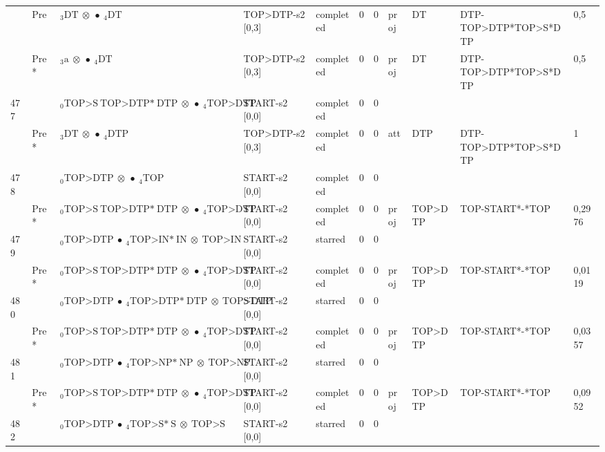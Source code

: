 \documentclass[10pt]{article}
\begin{document}
\begin{longtable}[htbp]{lllllllllll}
 & Pre & $ {}_3 \textrm{DT} \  \otimes \  \bullet \ {}_{4} \textrm{DT} $ & TOP>DTP-s2 [0,3] & completed & 0 & 0 & proj & DT & DTP-TOP>DTP*TOP>S*DTP & 0,5 \\ 
 & Pre *& $ {}_3 \textrm{a} \  \otimes \  \bullet \ {}_{4} \textrm{DT} $ & TOP>DTP-s2 [0,3] & completed & 0 & 0 & proj & DT & DTP-TOP>DTP*TOP>S*DTP & 0,5 \\ 
477 & & $ {}_0 \textrm{TOP>S} \ \textrm{TOP>DTP*} \ \textrm{DTP} \  \otimes \  \bullet \ {}_{4} \textrm{TOP>DTP} $ & START-s2 [0,0] & completed & 0 & 0 & & & & \\ 
 & Pre *& $ {}_3 \textrm{DT} \  \otimes \  \bullet \ {}_{4} \textrm{DTP} $ & TOP>DTP-s2 [0,3] & completed & 0 & 0 & att & DTP & DTP-TOP>DTP*TOP>S*DTP & 1 \\ 
478 & & $ {}_0 \textrm{TOP>DTP} \  \otimes \  \bullet \ {}_{4} \textrm{TOP} $ & START-s2 [0,0] & completed & 0 & 0 & & & & \\ 
 & Pre *& $ {}_0 \textrm{TOP>S} \ \textrm{TOP>DTP*} \ \textrm{DTP} \  \otimes \  \bullet \ {}_{4} \textrm{TOP>DTP} $ & START-s2 [0,0] & completed & 0 & 0 & proj & TOP>DTP & TOP-START*-*TOP & 0,2976 \\ 
479 & & $ {}_0 \textrm{TOP>DTP} \  \bullet \ {}_{4} \textrm{TOP>IN*} \ \textrm{IN} \  \otimes \ \textrm{TOP>IN} $ & START-s2 [0,0] & starred & 0 & 0 & & & & \\ 
 & Pre *& $ {}_0 \textrm{TOP>S} \ \textrm{TOP>DTP*} \ \textrm{DTP} \  \otimes \  \bullet \ {}_{4} \textrm{TOP>DTP} $ & START-s2 [0,0] & completed & 0 & 0 & proj & TOP>DTP & TOP-START*-*TOP & 0,0119 \\ 
480 & & $ {}_0 \textrm{TOP>DTP} \  \bullet \ {}_{4} \textrm{TOP>DTP*} \ \textrm{DTP} \  \otimes \ \textrm{TOP>DTP} $ & START-s2 [0,0] & starred & 0 & 0 & & & & \\ 
 & Pre *& $ {}_0 \textrm{TOP>S} \ \textrm{TOP>DTP*} \ \textrm{DTP} \  \otimes \  \bullet \ {}_{4} \textrm{TOP>DTP} $ & START-s2 [0,0] & completed & 0 & 0 & proj & TOP>DTP & TOP-START*-*TOP & 0,0357 \\ 
481 & & $ {}_0 \textrm{TOP>DTP} \  \bullet \ {}_{4} \textrm{TOP>NP*} \ \textrm{NP} \  \otimes \ \textrm{TOP>NP} $ & START-s2 [0,0] & starred & 0 & 0 & & & & \\ 
 & Pre *& $ {}_0 \textrm{TOP>S} \ \textrm{TOP>DTP*} \ \textrm{DTP} \  \otimes \  \bullet \ {}_{4} \textrm{TOP>DTP} $ & START-s2 [0,0] & completed & 0 & 0 & proj & TOP>DTP & TOP-START*-*TOP & 0,0952 \\ 
482 & & $ {}_0 \textrm{TOP>DTP} \  \bullet \ {}_{4} \textrm{TOP>S*} \ \textrm{S} \  \otimes \ \textrm{TOP>S} $ & START-s2 [0,0] & starred & 0 & 0 & & & & \\ 

\end{longtable}
\end{document}
